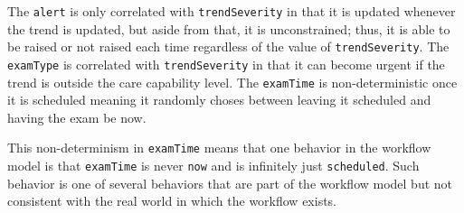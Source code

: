The \texttt{alert} is only correlated with \texttt{trendSeverity} in that it is updated whenever the trend is updated, but aside from that, it is unconstrained; thus, it is able to be raised or not raised each time regardless of the value of \texttt{trendSeverity}. The \texttt{examType} is correlated with \texttt{trendSeverity} in that it can become urgent if the trend is outside the care capability level. The \texttt{examTime} is non-deterministic once it is scheduled meaning it randomly choses between leaving it scheduled and having the exam be now.

This non-determinism in \texttt{examTime} means that one behavior in the workflow model is that \texttt{examTime} is never \texttt{now} and is infinitely just \texttt{scheduled}. Such behavior is one of several behaviors that are part of the workflow model but not consistent with the real world in which the workflow exists.
